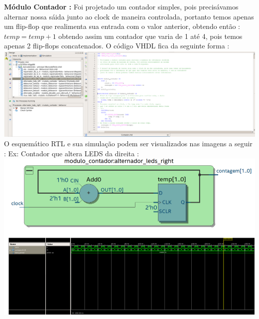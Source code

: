 \documentclass[11pt]{book}
\begin{document}
\textbf{Módulo Contador :} 
\newline\newline
Foi projetado um contador simples, pois precisávamos alternar nossa sáida junto ao clock de maneira controlada, portanto temos apenas um flip-flop que realimenta sua entrada com o valor anterior, obtendo então : 
\newline\newline
$temp = temp + 1$ obtendo assim um contador que varia de 1 até 4, pois temos apenas 2 flip-flops concatenados.
\newline\newline
O código VHDL fica da seguinte forma :
\newline\newline
\includegraphics[width=1.1\textwidth]{codigo_contador.png}%
\newline
O esquemático RTL e sua simulação podem ser visualizados nas imagens a seguir :
\newline
\newpage Ex: Contador que altera LEDS da direita :
\newline
\includegraphics[width=1.1\textwidth]{RTL_contadorLEDSdireita_simulacao_contador.png}%
\newline
\end{document}

